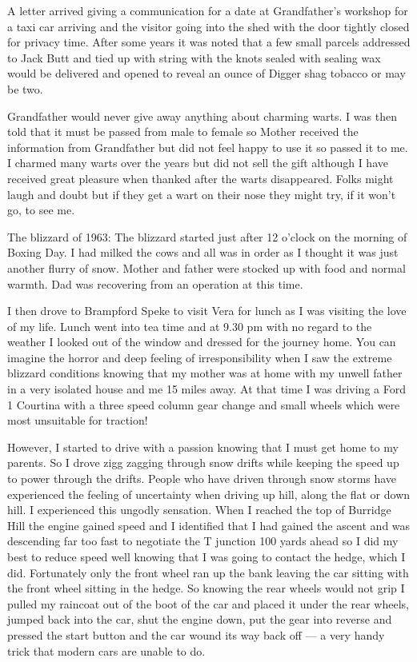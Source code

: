 A letter arrived giving a communication for a date at Grandfather's workshop for
a taxi car arriving and the visitor going into the shed with the door tightly
closed for privacy time.  After some years it was noted that a few small
parcels addressed to Jack Butt and tied up with string with the knots sealed
with sealing wax would be delivered and opened to reveal an ounce of Digger
shag tobacco or may be two.

Grandfather would never give away anything about charming warts.  I was then
told that it must be passed from male to female so Mother received the
information from Grandfather but did not feel happy to use it so passed it to
me.  I charmed many warts over the years but did not sell the gift although I
have received great pleasure when thanked after the warts disappeared.  Folks
might laugh and doubt but if they get a wart on their nose they might try, if
it won't go, to see me.

The blizzard of 1963:  The blizzard started just after 12 o'clock on the morning
of Boxing Day.  I had milked the cows and all was in order as I thought it was
just another flurry of snow.  Mother and father were stocked up with food and
normal warmth.  Dad was recovering from an operation at this time.

I then drove to Brampford Speke to visit Vera for lunch as I was visiting the
love of my life.  Lunch went into tea time and at 9.30 pm with no regard to the
weather I looked out of the window and dressed for the journey home.  You can
imagine the horror and deep feeling of irresponsibility when I saw the extreme
blizzard conditions knowing that my mother was at home with my unwell father in
a very isolated house and me 15 miles away.  At that time I was driving a Ford
1 Courtina with a three speed column gear change and small wheels which were
most unsuitable for traction!

However, I started to drive with a passion knowing that I must get home to my
parents.  So I drove zigg zagging through snow drifts while keeping the speed
up to power through the drifts. People who have driven through snow storms have
experienced the feeling of uncertainty when driving up hill, along the flat or
down hill.  I experienced this ungodly sensation.  When I reached the top of
Burridge Hill the engine gained speed and I identified that I had gained the
ascent and was descending far too fast to negotiate the T junction 100 yards
ahead so I did my best to reduce speed well knowing that I was going to contact
the hedge, which I did.  Fortunately only the front wheel ran up the bank
leaving the car sitting with the front wheel sitting in the hedge.  So knowing
the rear wheels would not grip I pulled my raincoat out of the boot of the car
and placed it under the rear wheels, jumped back into the car, shut the engine
down, put the gear into reverse and pressed the start button and the car wound
its way back off --- a very handy trick that modern cars are unable to do.


